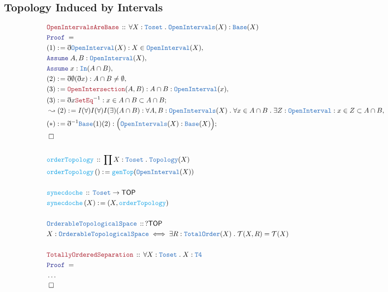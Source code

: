 \documentclass[12pt]{scrartcl}
\newcommand{\TYPE}[1]{\textcolor{NavyBlue}{\mathtt{#1}}}
\newcommand{\FUNC}[1]{\textcolor{Cerulean}{\mathtt{#1}}}
\newcommand{\LOGIC}[1]{\textcolor{Blue}{\mathtt{#1}}}
\newcommand{\THM}[1]{\textcolor{Maroon}{\mathtt{#1}}}
\renewcommand{\.}{\; . \;}
\newcommand{\de}{: \kern 0.1pc =}
\newcommand{\Act}[1]{\left( #1 \right)}
\newcommand{\Theorem}[2]{& \THM{#1} \, :: \, #2 \\ & \Proof = \\ }
\newcommand{\DeclareType}[2]{& \TYPE{#1} \, :: \, #2 \\}
\newcommand{\DefineType}[3]{& #1 : \TYPE{#2} \iff #3 \\}
\newcommand{\DeclareFunc}[2]{& \FUNC{#1} \, :: \, #2 \\}
\newcommand{\DefineFunc}[3]{&  \FUNC{#1}\Act{#2} \de #3 \\}
\newcommand{\Page}[1]{ \begin{align*} #1 \end{align*}   }
\newcommand{ \bd }{ \ByDef }
\newcommand{\NoProof}{ & \ldots \\ \EndProof}
\newcommand{\Say}[3]{& #1 \de #2 : #3, \\}
\newcommand{\Conclude}[3]{& #1 \de #2 : #3; \\}
\newcommand{\Derive}[3]{& \leadsto #1 \de #2 : #3, \\}
\newcommand{\A}{\LOGIC{Assume} \;}
\newcommand{\Assume}[2]{& \A #1 : #2, \\}
\newcommand{\QED}{\; \square}
\newcommand{\EndProof}{& \QED \\}
\newcommand{\ByDef}{\eth}
\newcommand{\Proof}{\LOGIC{Proof} \; }
\begin{document}
\subsection{Topology Induced by Intervals}
\Page{
	\Theorem{OpenIntervalsAreBase}{\forall X : \TYPE{Toset} \. \TYPE{OpenIntervals}(X) : \TYPE{Base}(X) }
	\Say{(1)}{ \bd \TYPE{OpenInterval}(X) }{  X \in \TYPE{OpenInterval}(X)  }
	\Assume{ A,B }{ \TYPE{OpenInterval}(X) }
	\Assume{x}{\TYPE{In}(A \cap B)}
	\Say{(2)}{ \bd \emptyset(\bd x)}{ A \cap B \neq \emptyset  }
	\Say{(3)}{ \THM{OpenIntersection}(A,B) }{ A \cap B : \TYPE{OpenInterval}(x) }
	\Conclude{(3)}{\bd x \THM{SetEq}^{-1}}{   x \in A \cap B \subset A \cap B   }
	\Derive{(2)}{ I(\forall)I(\forall)I(\exists)(A \cap B)}
	{ \forall A,B : \TYPE{OpenIntervals}(X) \. \forall x \in A \cap B \. \exists Z : \TYPE{OpenInterval} : 
	x \in Z \subset A \cap B     }
	\Conclude{(*)}{\bd^{-1} \TYPE{Base}(1)(2)}{ \Big( \TYPE{OpenIntervals}(X) : \TYPE{Base}(X)  \Big)}
	\EndProof
	\\
	\DeclareFunc{orderTopology}{  \prod X : \TYPE{Toset} \. \TYPE{Topology}(X)   }
	\DefineFunc{orderTopology}{}{ \FUNC{genTop}(\TYPE{OpenInterval}(X))}
	\\
	\DeclareFunc{synecdoche}{ \TYPE{Toset} \to \mathsf{TOP} }
	\DefineFunc{synecdoche}{ X  }{ (X,  \FUNC{orderTopology}) }
	\\
	\DeclareType{OrderableTopologicalSpace }{ ? \mathsf{TOP}  }
	\DefineType{X}{OrderableTopologicalSpace}
	{ \exists R : \TYPE{TotalOrder}(X) \. \mathcal{T}(X,R) = \mathcal{T}(X)}
	\\
	\Theorem{TotallyOrderedSeparation}{ \forall X : \TYPE{Toset} \.  X : \TYPE{T4}  }
	\NoProof
}
\newpage
\end{document}
